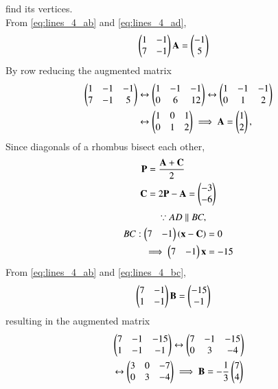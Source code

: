 \begin{enumerate}[label=\arabic*.,ref=\thesubsection.\theenumi]
\begin{equation}
\label{eq:lines_4_p}
\end{equation}
find its vertices.
\\
\solution From \eqref{eq:lines_4_ab} and \eqref{eq:lines_4_ad},
\begin{align}
\begin{pmatrix}1 & -1 \\ 7 & -1\end{pmatrix}\mathbf{A}  &=\begin{pmatrix}-1 \\ 5\end{pmatrix}
\end{align}
%
By row reducing the augmented matrix
\begin{align}
\begin{pmatrix}1 & -1 & -1\\ 7 & -1 & 5\end{pmatrix}  &\leftrightarrow \begin{pmatrix}1 & -1 & -1\\ 0 & 6 & 12\end{pmatrix}\leftrightarrow \begin{pmatrix}1 & -1 & -1\\ 0 & 1 & 2\end{pmatrix}
\nonumber \\
&\leftrightarrow \begin{pmatrix}1 & 0 & 1\\ 0 & 1 & 2\end{pmatrix} \implies \mathbf{A}=\begin{pmatrix}1\\ 2\end{pmatrix},
\label{eq:lines_4_a}
\end{align}
%
Since diagonals of a rhombus bisect each other, 
\begin{align}
\mathbf{P}&=\frac{\mathbf{A}+\mathbf{C}}{2}
\nonumber \\
\mathbf{C}&=2\mathbf{P}-\mathbf{A} = \begin{pmatrix}-3\\-6\end{pmatrix}
\label{eq:lines_4_c}
\end{align}
%
\begin{align}
\because AD \parallel BC,&
\nonumber \\
BC: \begin{pmatrix}7 & -1\end{pmatrix}\left(\mathbf{x}-\mathbf{C}\right) &=0
\nonumber \\
\implies \begin{pmatrix}7 & -1\end{pmatrix}\mathbf{x} &=-15
\label{eq:lines_4_bc}
\end{align}
%
From \eqref{eq:lines_4_ab} and \eqref{eq:lines_4_bc},
\begin{align}
 \begin{pmatrix}7 & -1 \\ 1 & -1\end{pmatrix}\mathbf{B} &=\begin{pmatrix}-15 \\ -1\end{pmatrix}
\end{align}
resulting in the augmented matrix
\begin{align}
& \begin{pmatrix}7 & -1 & -15\\ 1 & -1 & -1\end{pmatrix} 
\leftrightarrow
 \begin{pmatrix}7 & -1 & -15\\ 0 & 3 & -4\end{pmatrix} 
\nonumber \\
&\leftrightarrow
 \begin{pmatrix}3 & 0 & -7\\ 0 & 3 & -4\end{pmatrix} \implies \mathbf{B} = -\frac{1}{3}\begin{pmatrix}7\\4\end{pmatrix}
\end{align}
\begin{align}

\end{align}
\end{enumerate}
